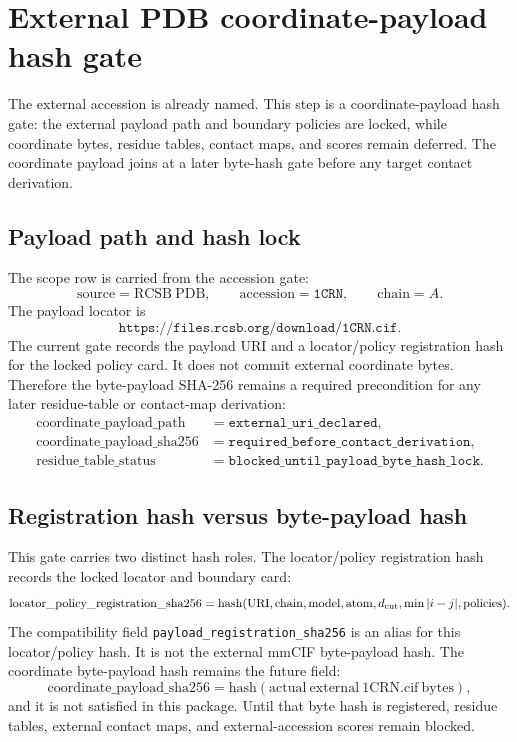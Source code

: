 
\section{External PDB coordinate-payload hash gate}

The external accession is already named. This step is a coordinate-payload hash gate: the external payload path and boundary policies are locked, while coordinate bytes, residue tables, contact maps, and scores remain deferred. The coordinate payload joins at a later byte-hash gate before any target contact derivation.

\subsection{Payload path and hash lock}

The scope row is carried from the accession gate:
\[
  \mathrm{source}=\mathrm{RCSB\ PDB},\qquad
  \mathrm{accession}=\texttt{1CRN},\qquad
  \mathrm{chain}=A.
\]
The payload locator is
\[
  \texttt{https://files.rcsb.org/download/1CRN.cif}.
\]
The current gate records the payload URI and a locator/policy registration hash for the locked policy card. It does not commit external coordinate bytes. Therefore the byte-payload SHA-256 remains a required precondition for any later residue-table or contact-map derivation:
\[
\begin{aligned}
  \mathrm{coordinate\_payload\_path}&=\texttt{external\_uri\_declared},\\
  \mathrm{coordinate\_payload\_sha256}&=\texttt{required\_before\_contact\_derivation},\\
  \mathrm{residue\_table\_status}&=\texttt{blocked\_until\_payload\_byte\_hash\_lock}. %
\end{aligned}
\]


\subsection{Registration hash versus byte-payload hash}

This gate carries two distinct hash roles. The locator/policy registration hash records the locked locator and boundary card:
\[
  \mathrm{locator\_policy\_registration\_sha256}
  =\mathrm{hash}(\mathrm{URI},\mathrm{chain},\mathrm{model},\mathrm{atom},d_{\rm cut},\min |i-j|,\mathrm{policies}).
\]
The compatibility field \texttt{payload\_registration\_sha256} is an alias for this locator/policy hash. It is not the external mmCIF byte-payload hash. The coordinate byte-payload hash remains the future field:
\[
  \mathrm{coordinate\_payload\_sha256}
  =\mathrm{hash}(\mathrm{actual\ external\ 1CRN.cif\ bytes}),
\]
and it is not satisfied in this package. Until that byte hash is registered, residue tables, external contact maps, and external-accession scores remain blocked.

